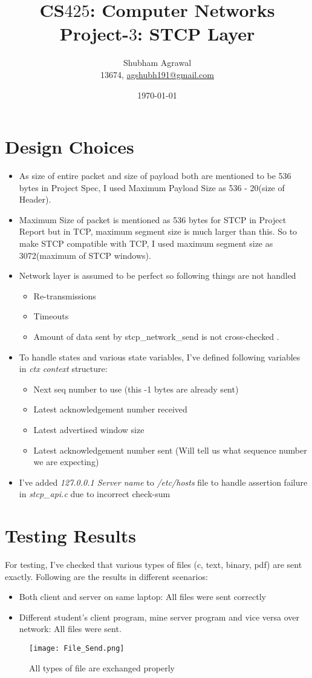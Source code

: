\documentclass[11pt,a4paper,titlepage]{article}
\title{\blue CS$425$: Computer Networks \\
\blueb Project-$3$: STCP Layer}
\author{Shubham Agrawal \\
13674, \href{mailto:agshubh191@gmail.com}{agshubh191@gmail.com}}
\date{\today}
\begin{document}
\maketitle
\section{Design Choices}
\begin{itemize}
\item As size of entire packet and size of payload both are mentioned to be 536 bytes in Project Spec, I used Maximum Payload Size as 536 - 20(size of Header). 
\item Maximum Size of packet is mentioned as 536 bytes for STCP in Project Report but in TCP, maximum segment size is much larger than this. So to make STCP compatible with TCP, I used maximum segment size as 3072(maximum of STCP windows).
\item Network layer is assumed to be perfect so following things are not handled
\begin{itemize}
\item Re-transmissions 
\item Timeouts
\item Amount of data sent by stcp\_network\_send is not cross-checked . 
\end{itemize}
\item To handle states and various state variables, I've defined following variables in \textit{ctx context} structure: 
\begin{itemize}
\item Next seq number to use (this -1 bytes are already sent)
\item Latest acknowledgement number received
\item Latest advertised window size
\item Latest acknowledgement number sent (Will tell us what sequence number we are expecting)
\end{itemize}
\item I've added \textit{127.0.0.1 Server name} to \textit{/etc/hosts} file to handle assertion failure in \textit{stcp\_api.c} due to incorrect check-sum 
\end{itemize}

\newpage

\section{Testing Results}
For testing, I've checked that various types of files (c, text, binary, pdf) are sent exactly. Following are the results in different scenarios:
\begin{itemize}
\item Both client and server on same laptop: All files were sent correctly
\item Different student's client program, mine server program and vice versa over network: All files were sent.
\end{itemize}
\begin{figure}[H]
\texttt{[image: File\_Send.png]}
\caption{All types of file are exchanged properly}
\end{figure}
\newpage
\end{document}
